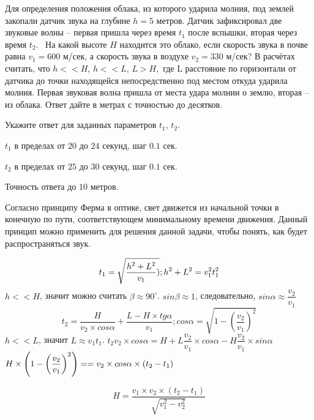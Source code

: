 Для определения положения облака, из которого ударила
молния, под землей закопали датчик звука на глубине $h=5$ метров. Датчик 
зафиксировал две звуковые волны – первая пришла через время $t_1$ после
вспышки, вторая через время $t_2$.  На какой
высоте $H$ находится это облако,
если скорость звука в почве равна \linebreak $v_1 = 600$ м/сек, а скорость
звука в воздухе $v_2 = 330$ м/сек? В расчётах
считать, что $h << H$, $h << L$, $L >  H$, где L расстояние по горизонтали от датчика до точки находящейся непосредственно под местом откуда ударила молния. Первая
звуковая волна пришла от места удара молнии о землю, вторая – из облака. Ответ дайте в метрах с точностью до десятков.


Укажите ответ для заданных параметров $ t_1$, $t_2$.

\paramSection

$t_1$ в пределах от $20$ до $24$ секунд, шаг  $0.1$ сек.  

$t_2$ в пределах от $25$ до $30$ секунд, шаг  $0.1$ сек.

Точность ответа  до $10$ метров.

\soultionSection

Согласно принципу Ферма в оптике, свет движется из начальной точки в конечную по пути, 
соответствующем минимальному времени движения. Данный принцип можно применить для решения данной задачи, 
чтобы понять, как будет распространяться звук.

$$t_1=\sqrt{\dfrac{h^2+L^2}{v_1} )}; \space h^2+L^2=v_1^2 t_1^2$$
$h<<H$, значит можно считать $\beta  \approx 90^{\circ}$. $sin\beta  \approx 1$, следовательно,  
$sin \alpha  \approx \dfrac{v_2}{v_1}$ 
$$t_2=\dfrac{H}{v_2  \times cos \alpha}+\dfrac{L-H \times tg \alpha }{v_1}; 
cos \alpha =\sqrt{1-\left(\dfrac{v_2}{v_1}\right)^2}$$
$h<<L$, значит $L \approx v_1 t_1$. $t_2 v_2 \times cos \alpha =H+L \dfrac{v_2}{v_1} \times cos \alpha -H \dfrac{v_2}{v_1} \times sin \alpha$  
$H \times \left(1-\left(\dfrac{v_2}{v_1} \right)^2 \right)= \linebreak = v_2 \times cos \alpha  \times (t_2-t_1 )$

$$H=\dfrac{v_1 \times v_2 \times (t_2-t_1 )}{\sqrt{v_1^2-v_2^2}}$$

